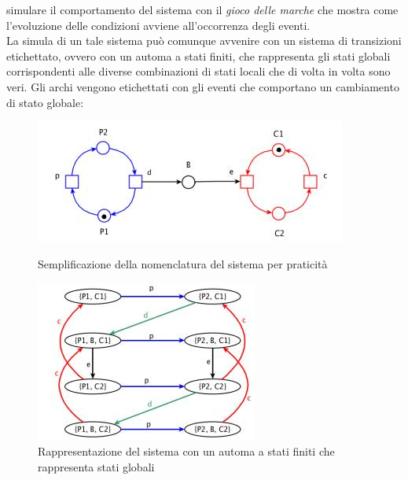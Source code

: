 \documentclass[a4paper,12pt, oneside]{book}
\begin{document}
\begin{esempio}
{    simulare il comportamento del sistema con il \textit{gioco delle marche} che
    mostra come l'evoluzione delle condizioni avviene all'occorrenza degli
    eventi.} \\
  La simula di un tale sistema può comunque avvenire con un sistema di
  transizioni etichettato, ovvero con un automa a stati finiti, che rappresenta
  gli stati globali corrispondenti alle diverse combinazioni di stati locali che
  di volta in volta sono veri. Gli archi vengono etichettati con gli eventi che
  comportano un cambiamento di stato globale:
  \begin{figure}[H]
    \centering
    \includegraphics[scale = 0.7]{img/prod3.jpg}
    \caption{Semplificazione della nomenclatura del sistema per praticità}
    \includegraphics[scale = 0.8]{img/prod2.jpg}
    \caption{Rappresentazione del sistema con un automa a stati finiti che
      rappresenta stati globali}
  \end{figure}
\end{esempio}
\end{document}
